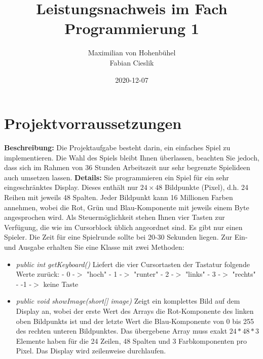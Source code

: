 \documentclass{article}
\title{Leistungsnachweis im Fach Programmierung 1}
\date{2020-12-07}
\author{Maximilian von Hohenbühel \\ Fabian Cieslik}
\begin{document}
\maketitle
\newpage
\tableofcontents %
\newpage

\section{Projektvorraussetzungen}
\textbf{Beschreibung:} Die Projektaufgabe besteht darin, ein einfaches Spiel zu implementieren. Die Wahl des Spiels bleibt Ihnen überlassen, beachten Sie jedoch, dass sich im Rahmen von 36 Stunden Arbeitszeit nur sehr begrenzte Spielideen auch umsetzen lassen.
\newline
\textbf{Details:} Sie programmieren ein Spiel für ein sehr eingeschränktes Display. Dieses enthält nur $24\times 48$ Bildpunkte (Pixel), d.h. 24 Reihen mit jeweils 48 Spalten. Jeder Bildpunkt kann 16 Millionen Farben annehmen, wobei die Rot, Grün und Blau-Komponente mit jeweils einem Byte angesprochen wird. Als Steuermöglichkeit stehen Ihnen vier Tasten zur Verfügung, die wie im Cursorblock üblich angeordnet sind. Es gibt nur einen Spieler. Die Zeit für eine Spielrunde sollte bei 20-30 Sekunden liegen.
\newline
Zur Ein- und Ausgabe erhalten Sie eine Klasse mit zwei Methoden:
\begin{itemize}
    \item \textit{public int getKeyboard()}
        \newline
        Liefert die vier Cursortasten der Tastatur folgende Werte zurück:
        \newline - 0 -$>$ "hoch"
        \newline - 1 -$>$ "runter"
        \newline - 2 -$>$ "links"
        \newline - 3 -$>$ "rechts"
        \newline - -1 -$>$ keine Taste
    \item \textit{public void showImage(short[] image)}
        \newline
        Zeigt ein komplettes Bild auf dem Display an, wobei der erste Wert des Arrays die Rot-Komponente des linken oben Bildpunkts ist und der letzte Wert die Blau-Komponente von 0 bis 255 des rechten unteren Bildpunktes. Das übergebene Array muss exakt $24*48*3$ Elemente haben für die 24 Zeilen, 48 Spalten und 3 Farbkomponenten pro Pixel. Das Display wird zeilenweise durchlaufen.
\end{itemize}
\end{document}
